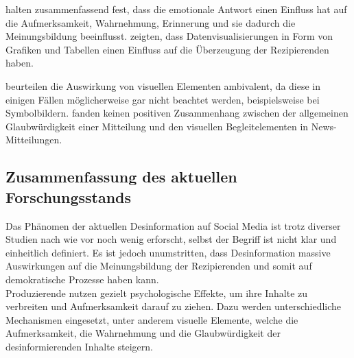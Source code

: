 \documentclass[12pt,a4paper]{article}        %
\begin{document}
\pagebreak
\textcite[23]{zhou_effects_2005} halten zusammenfassend fest, dass die emotionale Antwort einen Einfluss hat auf die Aufmerksamkeit, Wahrnehmung, Erinnerung und sie dadurch die Meinungsbildung beeinflusst. \textcite{pandey_persuasive_2014} zeigten, dass Datenvisualisierungen in Form von Grafiken und Tabellen einen Einfluss auf die Überzeugung der Rezipierenden haben.

\textcite[501]{schaewitz_when_2020} beurteilen die Auswirkung von visuellen Elementen ambivalent, da diese in einigen Fällen möglicherweise gar nicht beachtet werden, beispielsweise bei Symbolbildern. \textcite[309]{henke_how_2020} fanden keinen positiven Zusammenhang zwischen der allgemeinen Glaubwürdigkeit einer Mitteilung und den visuellen Begleitelementen in News-Mitteilungen.

\subsection{Zusammenfassung des aktuellen Forschungsstands}
Das Phänomen der aktuellen Desinformation auf Social Media ist trotz diverser Studien nach wie vor noch wenig erforscht, selbst der Begriff ist nicht klar und einheitlich definiert. Es ist jedoch unumstritten, dass Desinformation massive Auswirkungen auf die Meinungsbildung der Rezipierenden und somit auf demokratische Prozesse haben kann. \\
Produzierende nutzen gezielt psychologische Effekte, um ihre Inhalte zu verbreiten und Aufmerksamkeit darauf zu ziehen. Dazu werden unterschiedliche Mechanismen eingesetzt, unter anderem visuelle Elemente, welche die Aufmerksamkeit, die Wahrnehmung und die Glaubwürdigkeit der desinformierenden Inhalte steigern.
\end{document}
